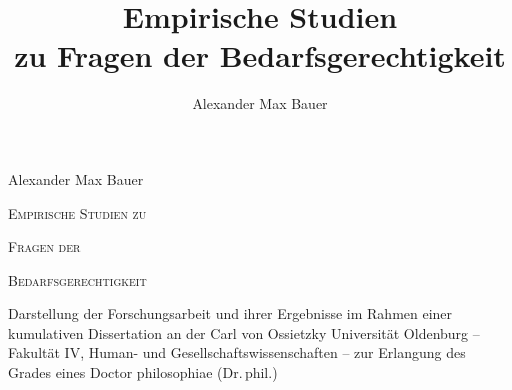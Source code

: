 \documentclass[justified,nobib,symmetric,twoside]{tufte-handout}
\title[Empirische Studien zu Fragen der Bedarfsgerechtigkeit]{Empirische Studien\\zu Fragen der Bedarfsgerechtigkeit}
\author[Alexander Max Bauer]{\upshape Alexander Max Bauer}
\date{}
\begin{document}
\begin{titlepage}
   \begin{center}
      \vspace*{3cm}
      {\LARGE Alexander Max Bauer}
      
      \vspace*{2cm}
      {\Huge\textsc{Empirische Studien zu}}
      
      \vspace*{0.3cm}
      {\Huge\textsc{Fragen der}}
      
      \vspace*{0.3cm}
      {\Huge\textsc{Bedarfsgerechtigkeit}}
      
      \vspace*{2cm}
      {\Large Darstellung der Forschungsarbeit und ihrer Ergebnisse im Rahmen einer kumulativen Dissertation an der Carl von Ossietzky Universität Oldenburg -- Fakultät IV, Human- und Gesellschafts­wissenschaften -- zur Erlangung des Grades eines Doctor philosophiae (Dr.\,phil.)}
   \end{center}
   \vfill
%    
%    
%    
%   
\vfill
\end{titlepage}

%    
%    


\clearpage
\setcounter{page}{1}
\maketitle
\end{document}
